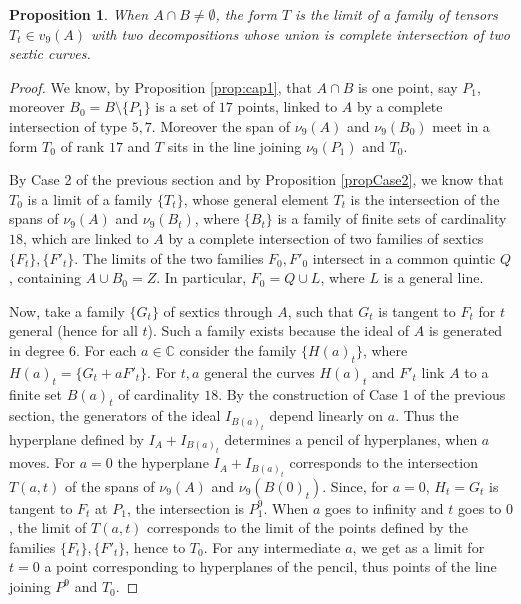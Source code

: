 \documentclass{amsart}
\newcommand{\C}{\mathbb{C}}
\newtheorem{prop0}[thm0]{Proposition}
\theoremstyle{definition}
\begin{document}
\begin{prop0}\label{tplust0}  When $A\cap B\neq \emptyset$, the form $T$ is the limit of a family of tensors $T_t\in v_9(A)$
with two decompositions whose union is complete intersection of two sextic curves.
\end{prop0}
\begin{proof} We know, by Proposition \ref{prop:cap1}, that $A\cap B$ is one point, say $P_1$, moreover $B_0=B\setminus \{P_1\}$
is a set of $17$ points, linked to $A$ by a complete intersection of type $5,7$. Moreover the span of $\nu_9(A)$ and $\nu_9(B_0)$
meet in a form $T_0$ of rank $17$ and $T$ sits in the line joining $\nu_9(P_1)$ and $T_0$.


By Case 2 of the previous section and by Proposition \ref{propCase2}, we know that $T_0$ is a limit of a family $\{T_t\}$, whose
general element $T_t$ is the intersection of the spans of $\nu_9(A)$ and $\nu_9(B_t)$, where $\{B_t\}$ is a family of finite sets
of cardinality $18$, which are linked to $A$ by a complete intersection of two families of sextics $\{F_t\}, \{F'_t\}$. The limits of the two
families $F_0,F'_0$ intersect in a common quintic $Q$, containing $A\cup B_0=Z$. In particular, $F_0=Q\cup L$, where $L$ is a general line. 

 Now, take a family $\{G_t\}$ of sextics through $A$, such that $G_t$ is tangent to $F_t$ for $t$ general (hence for all $t$). Such a family exists because
 the ideal of $A$ is generated in degree $6$. For each $a\in \C$  consider the family $\{H(a)_t\}$, where $H(a)_t=\{G_t +aF'_t\}$. For $t,a$ general the curves
 $H(a)_t$ and $F'_t$ link $A$ to a finite set $B(a)_t$ of cardinality $18$. By the construction of Case 1 of the previous section,
 the generators of the ideal $I_{B(a)_t}$ depend linearly on $a$. Thus  the hyperplane defined by $I_A+I_{B(a)_t}$ determines a pencil of
 hyperplanes, when $a$ moves. For $a=0$ the hyperplane $I_A+I_{B(a)_t}$ corresponds to the intersection $T(a,t)$ of the spans of
 $\nu_9(A)$ and $\nu_9(B(0)_t)$. Since, for $a=0$, $H_t=G_t$ is tangent to $F_t$ at $P_1$, the intersection is $P_1^9$.
 When $a$ goes to infinity and $t$ goes to $0$, the limit of $T(a,t)$ corresponds to the limit of the points defined by the families $\{F_t\}, \{F'_t\}$,
 hence to $T_0$. For any intermediate $a$, we get as a limit for $t=0$ a point corresponding to hyperplanes of the pencil,
 thus points of the line joining $P^9$ and $T_0$.
 
\end{proof}
\end{document}
